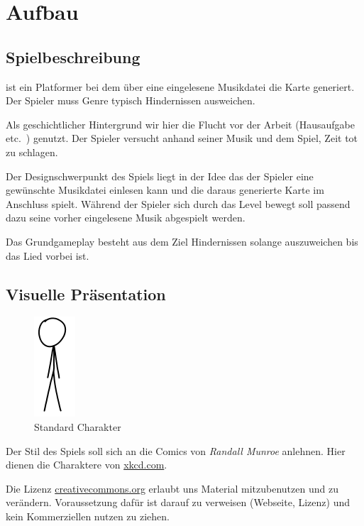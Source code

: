 \documentclass[Skript.tex]{subfiles}
\begin{document}
\section{Aufbau}

\subsection{Spielbeschreibung}

\gname ist ein Platformer bei dem über eine eingelesene Musikdatei die Karte generiert.
Der Spieler muss Genre typisch Hindernissen ausweichen.

Als geschichtlicher Hintergrund wir hier die Flucht vor der Arbeit (Hausaufgabe etc.\ ) genutzt. 
Der Spieler versucht anhand seiner Musik und dem Spiel, Zeit tot zu schlagen.

Der Designschwerpunkt des Spiels \gname liegt in der Idee das der Spieler eine gewünschte Musikdatei einlesen kann und die daraus generierte Karte im Anschluss spielt. 
Während der Spieler sich durch das Level bewegt soll passend dazu seine vorher eingelesene Musik abgespielt werden.

Das Grundgameplay besteht aus dem Ziel Hindernissen solange auszuweichen bis das Lied vorbei ist. 

\subsection{Visuelle Präsentation}
\begin{figure}
\vspace{-1.2cm}
  \begin{center}
    \includegraphics[scale=.9]{Grafik/char.png}
	\caption{Standard Charakter}
	\label{charakter}
  \end{center}
\end{figure}

Der Stil des Spiels \gname soll sich an die Comics von \textit{Randall Munroe} anlehnen.
Hier dienen die Charaktere von \href{http://xkcd.com}{xkcd.com}.




Die Lizenz \href{http://creativecommons.org/licenses/by-nc/2.5/}{creativecommons.org} erlaubt uns Material mitzubenutzen und  zu verändern.
Voraussetzung dafür ist darauf zu verweisen (Webseite, Lizenz) und kein Kommerziellen nutzen zu ziehen.
\end{document}
